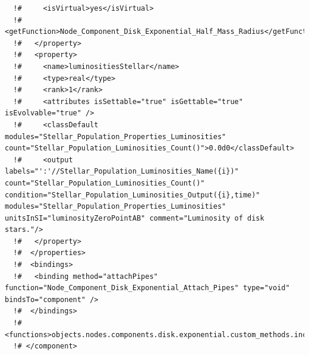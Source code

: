 \begin{verbatim}
  !#     <isVirtual>yes</isVirtual>
  !#     <getFunction>Node_Component_Disk_Exponential_Half_Mass_Radius</getFunction>
  !#   </property>
  !#   <property>
  !#     <name>luminositiesStellar</name>
  !#     <type>real</type>
  !#     <rank>1</rank>
  !#     <attributes isSettable="true" isGettable="true" isEvolvable="true" />
  !#     <classDefault modules="Stellar_Population_Properties_Luminosities" count="Stellar_Population_Luminosities_Count()">0.0d0</classDefault>
  !#     <output labels="':'//Stellar_Population_Luminosities_Name({i})" count="Stellar_Population_Luminosities_Count()" condition="Stellar_Population_Luminosities_Output({i},time)" modules="Stellar_Population_Properties_Luminosities" unitsInSI="luminosityZeroPointAB" comment="Luminosity of disk stars."/>
  !#   </property>
  !#  </properties>
  !#  <bindings>
  !#   <binding method="attachPipes" function="Node_Component_Disk_Exponential_Attach_Pipes" type="void" bindsTo="component" />
  !#  </bindings>
  !#  <functions>objects.nodes.components.disk.exponential.custom_methods.inc</functions>
  !# </component>
\end{verbatim}

